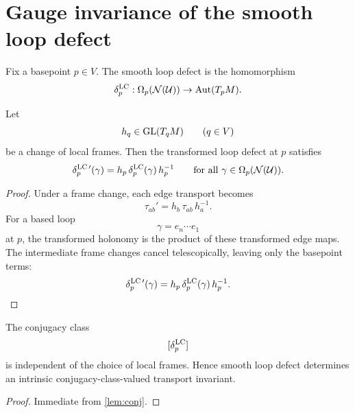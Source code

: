 \section{Gauge invariance of the smooth loop defect}
Fix a basepoint \(p\in V\).  The smooth loop defect is the homomorphism
\[
	\delta_p^{\mathrm{LC}}:\Omega_p(\mathcal N(\mathcal U))
	\to \operatorname{Aut}(T_pM).
\]
\begin{lemma}
	\label{lem:conj}
	Let
	\[
		h_q\in \mathrm{GL}(T_qM)
		\qquad(q\in V)
	\]
	be a change of local frames.  Then the transformed loop defect at \(p\)
	satisfies
	\[
		\delta_p^{\mathrm{LC}\,\prime}(\gamma)
		=
		h_p\,\delta_p^{\mathrm{LC}}(\gamma)\,h_p^{-1}
		\qquad
		\text{for all }\gamma\in \Omega_p(\mathcal N(\mathcal U)).
	\]
\end{lemma}
\begin{proof}
	Under a frame change, each edge transport becomes
	\[
		\tau_{ab}'=h_b\,\tau_{ab}\,h_a^{-1}.
	\]
	For a based loop
	\[
		\gamma=e_n\cdots e_1
	\]
	at \(p\), the transformed holonomy is the product of these transformed
	edge maps.  The intermediate frame changes cancel telescopically,
	leaving only the basepoint terms:
	\[
		\delta_p^{\mathrm{LC}\,\prime}(\gamma)
		=
		h_p\,\delta_p^{\mathrm{LC}}(\gamma)\,h_p^{-1}.
	\]
\end{proof}
\begin{corollary}
	The conjugacy class
	\[
		[\delta_p^{\mathrm{LC}}]
	\]
	is independent of the choice of local frames.  Hence smooth loop defect
	determines an intrinsic conjugacy-class-valued transport invariant.
\end{corollary}
\begin{proof}
	Immediate from \cref{lem:conj}.
\end{proof}
